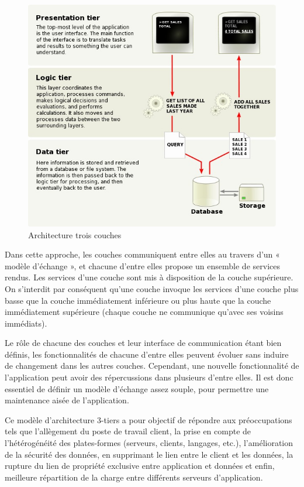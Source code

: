 \begin{figure}[h,b]
\begin{center}
    \includegraphics[scale=0.6]{img/3-tier}
    \caption{Architecture trois couches}
	\label{3-tier}
\end{center}
\end{figure}

Dans cette approche, les couches communiquent entre elles au travers d'un « modèle d'échange », et chacune d'entre elles propose un ensemble de services rendus. Les services d'une couche sont mis à disposition de la couche supérieure. On s'interdit par conséquent qu'une couche invoque les services d'une couche plus basse que la couche immédiatement inférieure ou plus haute que la couche immédiatement supérieure (chaque couche ne communique qu'avec ses voisins immédiats).

Le rôle de chacune des couches et leur interface de communication étant bien définis, les fonctionnalités de chacune d'entre elles peuvent évoluer sans induire de changement dans les autres couches. Cependant, une nouvelle fonctionnalité de l'application peut avoir des répercussions dans plusieurs d'entre elles. Il est donc essentiel de définir un modèle d'échange assez souple, pour permettre une maintenance aisée de l'application.

Ce modèle d'architecture 3-tiers a pour objectif de répondre aux préoccupations tels que l'allègement du poste de travail client, la prise en compte de l'hétérogénéité des plates-formes (serveurs, clients, langages, etc.), l'amélioration de la sécurité des données, en supprimant le lien entre le client et les données, la rupture du lien de propriété exclusive entre application et données et enfin, meilleure répartition de la charge entre différents serveurs d'application. \cite{3-tiers}

